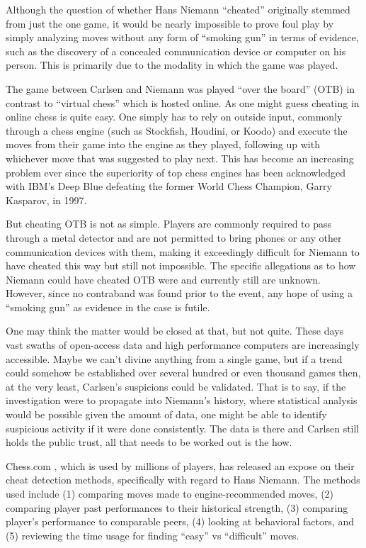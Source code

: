 \documentclass[12pt, letterpaper, titlepage]{article}
\begin{document}
Although the question of whether Hans Niemann “cheated” originally stemmed from just the one game, it would be nearly impossible to prove foul play by simply analyzing moves without any form of “smoking gun” in terms of evidence, such as the discovery of a concealed communication device or computer on his person. This is primarily due to the modality in which the game was played.

The game between Carlsen and Niemann was played “over the board” (OTB) in contrast to “virtual chess” which is hosted online. As one might guess cheating in online chess is quite easy. One simply has to rely on outside input, commonly through a chess engine (such as Stockfish, Houdini, or Koodo) and execute the moves from their game into the engine as they played, following up with whichever move that was suggested to play next. This has become an increasing problem ever since the superiority of top chess engines has been acknowledged with IBM's Deep Blue defeating the former World Chess Champion, Garry Kasparov, in 1997.

But cheating OTB is not as simple. Players are commonly required to pass through a metal detector and are not permitted to bring phones or any other communication devices with them, making it exceedingly difficult for Niemann to have cheated this way but still not impossible. The specific allegations as to how Niemann could have cheated OTB were and currently still are unknown. However, since no contraband was found prior to the event, any hope of using a “smoking gun” as evidence in the case is futile.

One may think the matter would be closed at that, but not quite. These days vast swaths of open-access data and high performance computers are increasingly accessible. Maybe we can't divine anything from a single game, but if a trend could somehow be established over several hundred or even thousand games then, at the very least, Carlsen's suspicions could be validated. That is to say, if the investigation were to propagate into Niemann's history, where statistical analysis would be possible given the amount of data, one might be able to identify suspicious activity if it were done consistently. The data is there and Carlsen still holds the public trust, all that needs to be worked out is the how.

Chess.com \citep{chess2022cheating}, which is used by millions of players, has released an expose on their cheat detection methods, specifically with regard to Hans Niemann. The methods used include (1) comparing moves made to engine-recommended moves, (2) comparing player past performances to their historical strength, (3) comparing player's performance to comparable peers, (4) looking at behavioral factors, and (5) reviewing the time usage for finding “easy” vs “difficult” moves.
\end{document}

